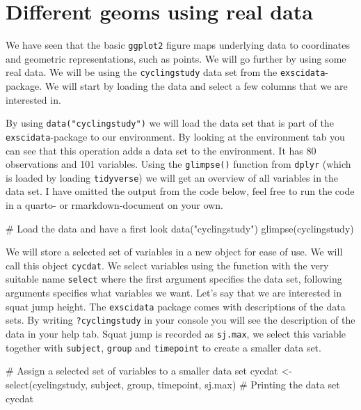 \documentclass[
  11pt,
  letterpaper,
]{scrbook}
\newenvironment{Shaded}{\begin{snugshade}}{\end{snugshade}}
\newcommand{\CommentTok}[1]{\textcolor[rgb]{0.37,0.37,0.37}{#1}}
\newcommand{\FunctionTok}[1]{\textcolor[rgb]{0.28,0.35,0.67}{#1}}
\newcommand{\NormalTok}[1]{\textcolor[rgb]{0.00,0.23,0.31}{#1}}
\newcommand{\OtherTok}[1]{\textcolor[rgb]{0.00,0.23,0.31}{#1}}
\newcommand{\StringTok}[1]{\textcolor[rgb]{0.13,0.47,0.30}{#1}}
\begin{document}
\hypertarget{different-geoms-using-real-data}{%
\section{Different geoms using real
data}\label{different-geoms-using-real-data}}

We have seen that the basic \texttt{ggplot2} figure maps underlying data
to coordinates and geometric representations, such as points. We will go
further by using some real data. We will be using the
\texttt{cyclingstudy} data set from the \texttt{exscidata}-package. We
will start by loading the data and select a few columns that we are
interested in.

By using \texttt{data("cyclingstudy")} we will load the data set that is
part of the \texttt{exscidata}-package to our environment. By looking at
the environment tab you can see that this operation adds a data set to
the environment. It has 80 observations and 101 variables. Using the
\texttt{glimpse()} function from \texttt{dplyr} (which is loaded by
loading \texttt{tidyverse}) we will get an overview of all variables in
the data set. I have omitted the output from the code below, feel free
to run the code in a quarto- or rmarkdown-document on your own.

\begin{Shaded}
\begin{Highlighting}[numbers=left,,]
\CommentTok{\# Load the data and have a first look}
\FunctionTok{data}\NormalTok{(}\StringTok{"cyclingstudy"}\NormalTok{)}
\FunctionTok{glimpse}\NormalTok{(cyclingstudy)}
\end{Highlighting}
\end{Shaded}

We will store a selected set of variables in a new object for ease of
use. We will call this object \texttt{cycdat}. We select variables using
the function with the very suitable name \texttt{select} where the first
argument specifies the data set, following arguments specifies what
variables we want. Let's say that we are interested in squat jump
height. The \texttt{exscidata} package comes with descriptions of the
data sets. By writing \texttt{?cyclingstudy} in your console you will
see the description of the data in your help tab. Squat jump is recorded
as \texttt{sj.max}, we select this variable together with
\texttt{subject}, \texttt{group} and \texttt{timepoint} to create a
smaller data set.

\begin{Shaded}
\begin{Highlighting}[numbers=left,,]
\CommentTok{\# Assign a selected set of variables to a smaller data set}
\NormalTok{cycdat }\OtherTok{\textless{}{-}} \FunctionTok{select}\NormalTok{(cyclingstudy, subject, group, timepoint, sj.max)}
\CommentTok{\# Printing the data set}
\NormalTok{cycdat}
\end{Highlighting}
\end{Shaded}
\end{document}
